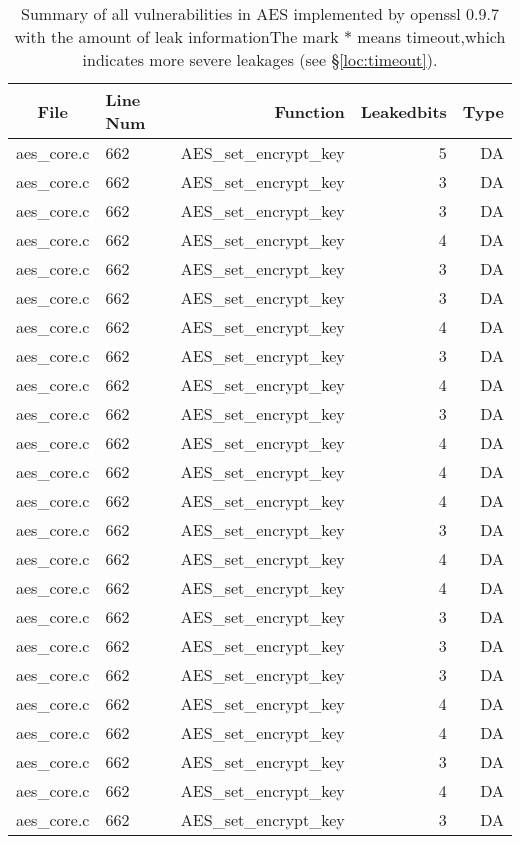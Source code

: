 \begin{table}%
\centering\scriptsize
\caption{Summary of all vulnerabilities in AES implemented by openssl 0.9.7 with the amount of leak informationThe mark $*$ means timeout,which indicates more severe leakages (see \S\ref{loc:timeout}).}\label{tab:AESopenssl}
\begin{tabular}{clrrr}
\hline
\textbf{File} & \textbf{Line Num} & \textbf{Function} & \textbf{Leakedbits} & \textbf{Type} \\\hline
aes\_core.c& 662&AES\_set\_encrypt\_key&5 &DA\\
aes\_core.c& 662&AES\_set\_encrypt\_key&3 &DA\\
aes\_core.c& 662&AES\_set\_encrypt\_key&3 &DA\\
aes\_core.c& 662&AES\_set\_encrypt\_key&4 &DA\\
aes\_core.c& 662&AES\_set\_encrypt\_key&3 &DA\\
aes\_core.c& 662&AES\_set\_encrypt\_key&3 &DA\\
aes\_core.c& 662&AES\_set\_encrypt\_key&4 &DA\\
aes\_core.c& 662&AES\_set\_encrypt\_key&3 &DA\\
aes\_core.c& 662&AES\_set\_encrypt\_key&4 &DA\\
aes\_core.c& 662&AES\_set\_encrypt\_key&3 &DA\\
aes\_core.c& 662&AES\_set\_encrypt\_key&4 &DA\\
aes\_core.c& 662&AES\_set\_encrypt\_key&4 &DA\\
aes\_core.c& 662&AES\_set\_encrypt\_key&4 &DA\\
aes\_core.c& 662&AES\_set\_encrypt\_key&3 &DA\\
aes\_core.c& 662&AES\_set\_encrypt\_key&4 &DA\\
aes\_core.c& 662&AES\_set\_encrypt\_key&4 &DA\\
aes\_core.c& 662&AES\_set\_encrypt\_key&3 &DA\\
aes\_core.c& 662&AES\_set\_encrypt\_key&3 &DA\\
aes\_core.c& 662&AES\_set\_encrypt\_key&3 &DA\\
aes\_core.c& 662&AES\_set\_encrypt\_key&4 &DA\\
aes\_core.c& 662&AES\_set\_encrypt\_key&4 &DA\\
aes\_core.c& 662&AES\_set\_encrypt\_key&3 &DA\\
aes\_core.c& 662&AES\_set\_encrypt\_key&4 &DA\\
aes\_core.c& 662&AES\_set\_encrypt\_key&3 &DA\\

\end{tabular}
\end{table}
